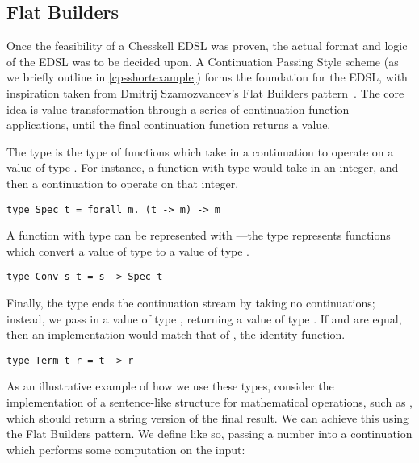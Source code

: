 \subsection{Flat Builders}

Once the feasibility of a Chesskell EDSL was proven, the actual format and logic of the EDSL was to be decided upon. A Continuation Passing Style scheme (as we briefly outline in \cref{cpsshortexample}) forms the foundation for the EDSL, with inspiration taken from Dmitrij Szamozvancev's Flat Builders pattern~\cite{mezzo}. The core idea is value transformation through a series of continuation function applications, until the final continuation function returns a value.

The type  is the type of functions which take in a continuation to operate on a value of type . For instance, a function with type  would take in an integer, and then a continuation to operate on that integer.

\begin{lstlisting}
type Spec t = forall m. (t -> m) -> m
\end{lstlisting}

A function with type  can be represented with ---the  type represents functions which convert a value of type  to a value of type .

\begin{lstlisting}
type Conv s t = s -> Spec t
\end{lstlisting}

Finally, the  type ends the continuation stream by taking no continuations; instead, we pass in a value of type , returning a value of type . If  and  are equal, then an implementation would match that of , the identity function.

\begin{lstlisting}
type Term t r = t -> r
\end{lstlisting}

As an illustrative example of how we use these types, consider the implementation of a sentence-like structure for mathematical operations, such as , which should return a string version of the final result. We can achieve this using the Flat Builders pattern. We define  like so, passing a number into a continuation which performs some computation on the input:

